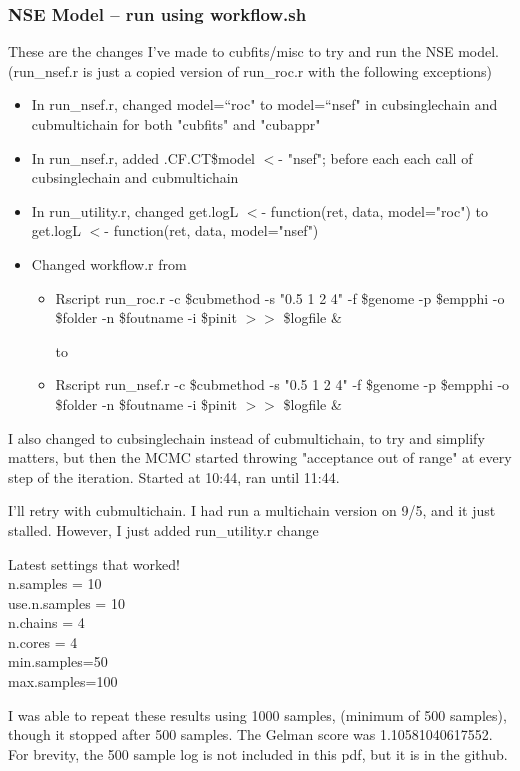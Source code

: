 \subsubsection{NSE Model -- run using workflow.sh}
These are the changes I've made to cubfits/misc to try and run the NSE model. (run\_nsef.r is just a copied version of run\_roc.r with the following exceptions)
\begin{itemize}
\item In run\_nsef.r, changed model=``roc" to model=``nsef" in cubsinglechain and cubmultichain for both "cubfits" and "cubappr"
\item In run\_nsef.r, added .CF.CT\$model $<$- "nsef"; before each each call of cubsinglechain and cubmultichain
\item In run\_utility.r, changed get.logL $<$- function(ret, data, model="roc") to get.logL $<$- function(ret, data, model="nsef")
\item Changed workflow.r from 
\begin{itemize}
\item Rscript run\_roc.r -c \$cubmethod -s "0.5 1 2 4" -f \$genome -p \$empphi -o \$folder -n \$foutname -i \$pinit $>>$ \$logfile \& 

to

\item Rscript run\_nsef.r -c \$cubmethod -s "0.5 1 2 4" -f \$genome -p \$empphi -o \$folder -n \$foutname -i \$pinit $>>$ \$logfile \&
\end{itemize}
\end{itemize}

I also changed to cubsinglechain instead of cubmultichain, to try and simplify matters, but then the MCMC started throwing "acceptance out of range" at every step of the iteration. Started at 10:44, ran until 11:44. 

I'll retry with cubmultichain. I had run a multichain version on 9/5, and it just stalled. However, I just added run\_utility.r change

Latest settings that worked!
\\n.samples = 10  
\\use.n.samples = 10
\\n.chains = 4
\\n.cores = 4
\\min.samples=50
\\max.samples=100




I was able to repeat these results using 1000 samples, (minimum of 500 samples), though it stopped after 500 samples. The Gelman score was 1.10581040617552. For brevity, the 500 sample log is not included in this pdf, but it is in the github.


